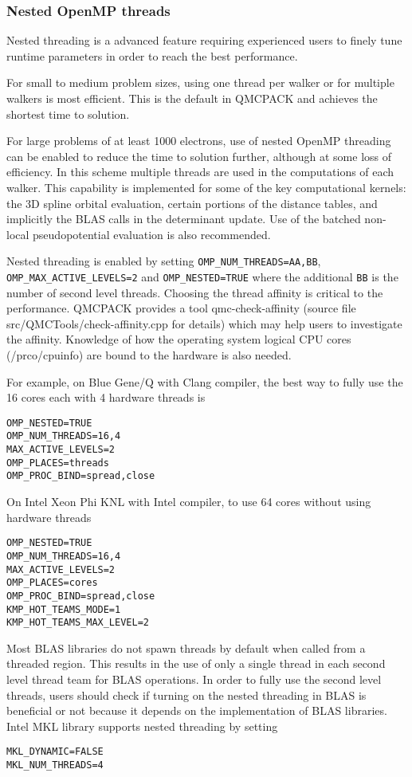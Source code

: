 \subsubsection{Nested OpenMP threads}
Nested threading is a advanced feature requiring experienced users to finely tune runtime parameters in order to reach the best performance.  

For small to medium problem sizes, using one thread per walker or for multiple walkers is most efficient. This is the default in QMCPACK and achieves the shortest time to solution.

For large problems of at least 1000 electrons, use of nested OpenMP threading can be enabled to reduce the time to solution further, although at some loss of efficiency. In this scheme multiple threads are used in the computations of each walker. This capability is implemented for some of the key computational kernels: the 3D spline orbital evaluation, certain portions of the distance tables, and implicitly the BLAS calls in the determinant update. Use of the batched non-local pseudopotential evaluation is also recommended.

Nested threading is enabled by setting \texttt{OMP\_NUM\_THREADS=AA,BB}, \texttt{OMP\_MAX\_ACTIVE\_LEVELS=2} and \texttt{OMP\_NESTED=TRUE} where the additional \texttt{BB} is the number of second level threads.  Choosing the thread affinity is critical to the performance.  QMCPACK provides a tool qmc-check-affinity (source file src/QMCTools/check-affinity.cpp for details) which may help users to investigate the affinity. Knowledge of how the operating system logical CPU cores (/prco/cpuinfo) are bound to the hardware is also needed.

For example, on Blue Gene/Q with Clang compiler, the best way to fully use the 16 cores each with 4 hardware threads is
\begin{verbatim}
OMP_NESTED=TRUE
OMP_NUM_THREADS=16,4
MAX_ACTIVE_LEVELS=2
OMP_PLACES=threads
OMP_PROC_BIND=spread,close
\end{verbatim}

On Intel Xeon Phi KNL with Intel compiler, to use 64 cores without using hardware threads
\begin{verbatim}
OMP_NESTED=TRUE
OMP_NUM_THREADS=16,4
MAX_ACTIVE_LEVELS=2
OMP_PLACES=cores
OMP_PROC_BIND=spread,close
KMP_HOT_TEAMS_MODE=1
KMP_HOT_TEAMS_MAX_LEVEL=2
\end{verbatim}

Most BLAS libraries do not spawn threads by default when called from a threaded region.
This results in the use of only a single thread in each second level thread team for BLAS operations. In order to fully use the second level threads,
users should check if turning on the nested threading in BLAS is beneficial or not
because it depends on the implementation of BLAS libraries.
Intel MKL library supports nested threading by setting
\begin{verbatim}
MKL_DYNAMIC=FALSE
MKL_NUM_THREADS=4
\end{verbatim}

